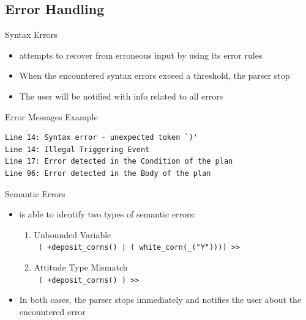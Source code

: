 \subsection{Error Handling}
\begin{frame}[fragile]{Syntax Errors}
  \begin{itemize}
    \item {} attempts to recover from erroneous input 
    by using its error rules
\n
    \item When the encountered syntax errors exceed a threshold, 
    the parser stop
\n
    \item The user will be notified with info related to all errors
    
  \end{itemize}
\N
  \begin{exampleblock}{Error Messages Example}
\begin{verbatim}
Line 14: Syntax error - unexpected token `)'
Line 14: Illegal Triggering Event
Line 17: Error detected in the Condition of the plan
Line 96: Error detected in the Body of the plan
\end{verbatim}
  \end{exampleblock}
%
\N\N
\end{frame}


\begin{frame}[fragile]{Semantic Errors}
  \begin{itemize}
    \item {} is able to identify two types of semantic errors:
\n
  \begin{enumerate}
    \item Unbounded Variable \\
\n
    \texttt {
        ( +\tildett deposit\_corns() | ( white\_corn(\_("Y")))) >>\\ 
            }
\N
    \item Attitude Type Mismatch \\
\n
    \texttt {
        ( +\tildett deposit\_corns() ) >>\\ 
            }

  \end{enumerate}
\n
  \item In both cases, the parser stops immediately and notifies the user
  about the encountered error
  \end{itemize}
%
\N\N
\end{frame}



